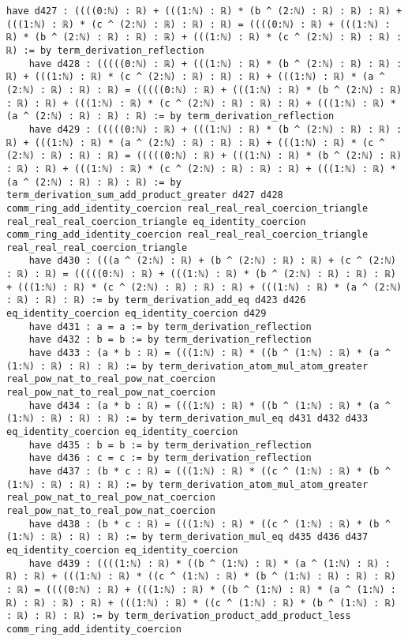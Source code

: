 \documentclass{article}
\begin{document}
\begin{tcolorbox}[colback=white!10, width=\linewidth]
\begin{lstlisting}[language=Lean4]
    have d427 : ((((0:ℕ) : ℝ) + (((1:ℕ) : ℝ) * (b ^ (2:ℕ) : ℝ) : ℝ) : ℝ) + (((1:ℕ) : ℝ) * (c ^ (2:ℕ) : ℝ) : ℝ) : ℝ) = ((((0:ℕ) : ℝ) + (((1:ℕ) : ℝ) * (b ^ (2:ℕ) : ℝ) : ℝ) : ℝ) + (((1:ℕ) : ℝ) * (c ^ (2:ℕ) : ℝ) : ℝ) : ℝ) := by term_derivation_reflection
    have d428 : (((((0:ℕ) : ℝ) + (((1:ℕ) : ℝ) * (b ^ (2:ℕ) : ℝ) : ℝ) : ℝ) + (((1:ℕ) : ℝ) * (c ^ (2:ℕ) : ℝ) : ℝ) : ℝ) + (((1:ℕ) : ℝ) * (a ^ (2:ℕ) : ℝ) : ℝ) : ℝ) = (((((0:ℕ) : ℝ) + (((1:ℕ) : ℝ) * (b ^ (2:ℕ) : ℝ) : ℝ) : ℝ) + (((1:ℕ) : ℝ) * (c ^ (2:ℕ) : ℝ) : ℝ) : ℝ) + (((1:ℕ) : ℝ) * (a ^ (2:ℕ) : ℝ) : ℝ) : ℝ) := by term_derivation_reflection
    have d429 : (((((0:ℕ) : ℝ) + (((1:ℕ) : ℝ) * (b ^ (2:ℕ) : ℝ) : ℝ) : ℝ) + (((1:ℕ) : ℝ) * (a ^ (2:ℕ) : ℝ) : ℝ) : ℝ) + (((1:ℕ) : ℝ) * (c ^ (2:ℕ) : ℝ) : ℝ) : ℝ) = (((((0:ℕ) : ℝ) + (((1:ℕ) : ℝ) * (b ^ (2:ℕ) : ℝ) : ℝ) : ℝ) + (((1:ℕ) : ℝ) * (c ^ (2:ℕ) : ℝ) : ℝ) : ℝ) + (((1:ℕ) : ℝ) * (a ^ (2:ℕ) : ℝ) : ℝ) : ℝ) := by term_derivation_sum_add_product_greater d427 d428 comm_ring_add_identity_coercion real_real_real_coercion_triangle real_real_real_coercion_triangle eq_identity_coercion comm_ring_add_identity_coercion real_real_real_coercion_triangle real_real_real_coercion_triangle
    have d430 : (((a ^ (2:ℕ) : ℝ) + (b ^ (2:ℕ) : ℝ) : ℝ) + (c ^ (2:ℕ) : ℝ) : ℝ) = (((((0:ℕ) : ℝ) + (((1:ℕ) : ℝ) * (b ^ (2:ℕ) : ℝ) : ℝ) : ℝ) + (((1:ℕ) : ℝ) * (c ^ (2:ℕ) : ℝ) : ℝ) : ℝ) + (((1:ℕ) : ℝ) * (a ^ (2:ℕ) : ℝ) : ℝ) : ℝ) := by term_derivation_add_eq d423 d426 eq_identity_coercion eq_identity_coercion d429
    have d431 : a = a := by term_derivation_reflection
    have d432 : b = b := by term_derivation_reflection
    have d433 : (a * b : ℝ) = (((1:ℕ) : ℝ) * ((b ^ (1:ℕ) : ℝ) * (a ^ (1:ℕ) : ℝ) : ℝ) : ℝ) := by term_derivation_atom_mul_atom_greater real_pow_nat_to_real_pow_nat_coercion real_pow_nat_to_real_pow_nat_coercion
    have d434 : (a * b : ℝ) = (((1:ℕ) : ℝ) * ((b ^ (1:ℕ) : ℝ) * (a ^ (1:ℕ) : ℝ) : ℝ) : ℝ) := by term_derivation_mul_eq d431 d432 d433 eq_identity_coercion eq_identity_coercion
    have d435 : b = b := by term_derivation_reflection
    have d436 : c = c := by term_derivation_reflection
    have d437 : (b * c : ℝ) = (((1:ℕ) : ℝ) * ((c ^ (1:ℕ) : ℝ) * (b ^ (1:ℕ) : ℝ) : ℝ) : ℝ) := by term_derivation_atom_mul_atom_greater real_pow_nat_to_real_pow_nat_coercion real_pow_nat_to_real_pow_nat_coercion
    have d438 : (b * c : ℝ) = (((1:ℕ) : ℝ) * ((c ^ (1:ℕ) : ℝ) * (b ^ (1:ℕ) : ℝ) : ℝ) : ℝ) := by term_derivation_mul_eq d435 d436 d437 eq_identity_coercion eq_identity_coercion
    have d439 : ((((1:ℕ) : ℝ) * ((b ^ (1:ℕ) : ℝ) * (a ^ (1:ℕ) : ℝ) : ℝ) : ℝ) + (((1:ℕ) : ℝ) * ((c ^ (1:ℕ) : ℝ) * (b ^ (1:ℕ) : ℝ) : ℝ) : ℝ) : ℝ) = ((((0:ℕ) : ℝ) + (((1:ℕ) : ℝ) * ((b ^ (1:ℕ) : ℝ) * (a ^ (1:ℕ) : ℝ) : ℝ) : ℝ) : ℝ) + (((1:ℕ) : ℝ) * ((c ^ (1:ℕ) : ℝ) * (b ^ (1:ℕ) : ℝ) : ℝ) : ℝ) : ℝ) := by term_derivation_product_add_product_less comm_ring_add_identity_coercion

\end{lstlisting}
\end{tcolorbox}
\end{document}
